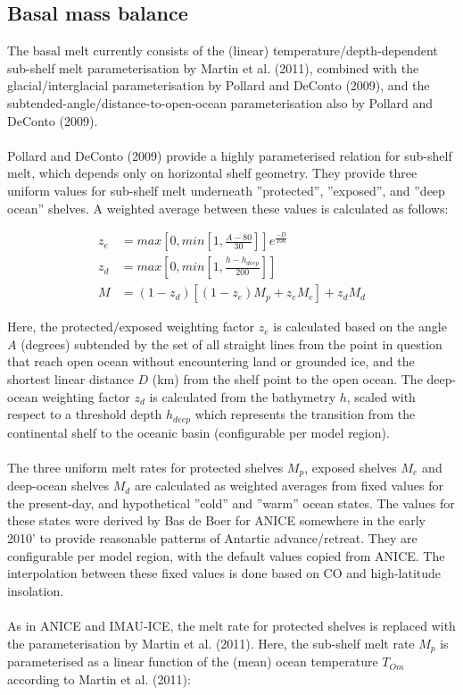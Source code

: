 \documentclass{article}
\begin{document}
\subsection{Basal mass balance}

The basal melt currently consists of the (linear) temperature/depth-dependent sub-shelf melt parameterisation by Martin et al. (2011), combined with the glacial/interglacial parameterisation by Pollard and DeConto (2009), and the subtended-angle/distance-to-open-ocean parameterisation also by Pollard and DeConto (2009).\\
\\
Pollard and DeConto (2009) provide a highly parameterised relation for sub-shelf melt, which depends only on horizontal shelf geometry. They provide three uniform values for sub-shelf melt underneath ''protected'', ''exposed'', and ''deep ocean'' shelves. A weighted average between these values is calculated as follows:

\begin{align}
z_e &= max[ 0, min[ 1, \frac{A - 80}{30} ]] e^{\frac{-D}{100}} \\
z_d &= max[ 0, min[ 1,  \frac{h - h_{deep}}{200} ]] \\
M &= (1 - z_d) \left[ (1 - z_e) M_p + z_e M_e \right] + z_d M_d
\end{align}

Here, the protected/exposed weighting factor $z_e$ is calculated based on the angle $A$ (degrees) subtended by the set of all straight lines from the point in question that reach open ocean without encountering land or grounded ice, and the shortest linear distance $D$ (km) from the shelf point to the open ocean. The deep-ocean weighting factor $z_d$ is calculated from the bathymetry $h$, scaled with respect to a threshold depth $h_{deep}$ which represents the transition from the continental shelf to the oceanic basin (configurable per model region).\\
\\
The three uniform melt rates for protected shelves $M_p$, exposed shelves $M_e$ and deep-ocean shelves $M_d$ are calculated as weighted averages from fixed values for the present-day, and hypothetical ''cold'' and ''warm'' ocean states. The values for these states were derived by Bas de Boer for ANICE somewhere in the early 2010' to provide reasonable patterns of Antartic advance/retreat. They are configurable per model region, with the default values copied from ANICE. The interpolation between these fixed values is done based on CO and high-latitude insolation.\\
\\
As in ANICE and IMAU-ICE, the melt rate for protected shelves is replaced with the parameterisation by Martin et al. (2011). Here, the sub-shelf melt rate $M_p$ is parameterised as a linear function of the (mean) ocean temperature $T_{Om}$ according to Martin et al. (2011):
\end{document}
